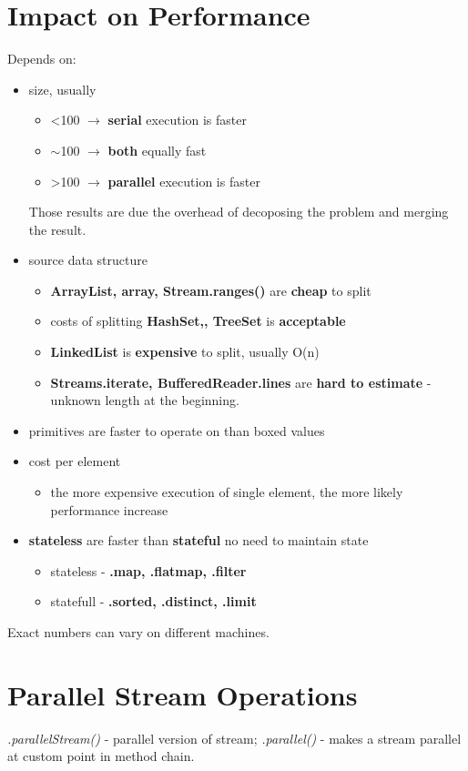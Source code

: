 \documentclass{report}
\begin{document}
\section{Impact on Performance}
Depends on:
\begin{itemize}
	\item size, usually
	\begin{itemize}
		\item \textless  100 $\rightarrow$ \textbf{serial} execution is faster
		\item $\sim$100 $\rightarrow$ \textbf{both} equally fast
		\item \textgreater 100 $\rightarrow$ \textbf{parallel}  execution is faster
		\end{itemize}
	Those results are due the overhead of decoposing the problem and merging the result.
	\item source data structure
	\begin{itemize}
		\item \textbf{ArrayList, array, Stream.ranges()} are \textbf{cheap} to split
		\item costs of splitting \textbf{HashSet,, TreeSet} is \textbf{acceptable}
		\item \textbf{LinkedList} is \textbf{expensive} to split, usually O(n)
		\item \textbf{Streams.iterate, BufferedReader.lines} are \textbf{hard to estimate} - unknown length at the beginning.
	\end{itemize}
	\item primitives are faster to operate on than boxed values
	\item cost per element
	\begin{itemize}
		\item the more expensive execution of single element, the more likely performance increase
	\end{itemize}
    \item \textbf{stateless} are faster than \textbf{stateful} no need to maintain state
    \begin{itemize}
    	\item stateless - \textbf{.map, .flatmap, .filter}
    	\item statefull - \textbf{.sorted, .distinct, .limit}
    \end{itemize}
\end{itemize}
Exact numbers can vary on different machines.

\section{Parallel Stream Operations}
\textit{.parallelStream()} - parallel version of stream;
\textit{.parallel()} - makes a stream parallel at custom point in method chain.
\end{document}

